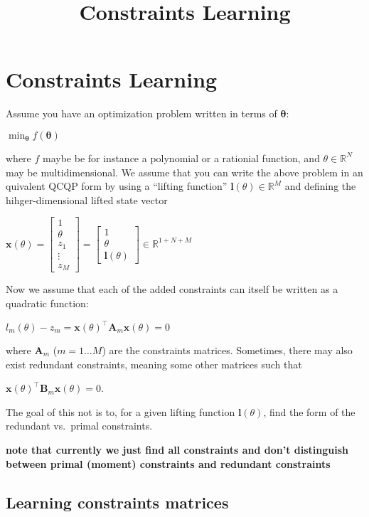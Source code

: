 \documentclass[11pt]{article}
\title{Constraints Learning}
\newcommand{\vc}[1]{\ensuremath{\bm{#1}}}
\begin{document}
  
\maketitle
  
\section{Constraints Learning}\label{constraints-learning}

Assume you have an optimization problem written in terms of
\(\vc{\theta}\):

\(\min_{\vc{\theta}} f(\vc{\theta})\)

where \(f\) maybe be for instance a polynomial or a rationial function,
and \(\theta \in \mathbb{R}^N\) may be multidimensional. We assume that
you can write the above problem in an quivalent QCQP form by using a
``lifting function'' \(\vc{l}(\theta) \in \mathbb{R}^M\) and
defining the hihger-dimensional lifted state vector

\(\vc{x}(\theta) = \begin{bmatrix}1 \\ \theta \\ z_1 \\ \vdots \\ z_M \end{bmatrix} = \begin{bmatrix}1 \\ \theta \\ \vc{l}(\theta) \end{bmatrix} \in \mathbb{R}^{1+N+M}\)

Now we assume that each of the added constraints can itself be written
as a quadratic function:

\(l_m(\theta) - z_m = \vc{x}(\theta)^\top \vc{A}_m \vc{x}(\theta) = 0\)

where \(\vc{A}_m\) (\(m=1\ldots M\)) are the constraints matrices.
Sometimes, there may also exist redundant constraints, meaning some
other matrices such that

\(\vc{x}(\theta)^\top \vc{B}_m \vc{x}(\theta) = 0\).

The goal of this not is to, for a given lifting function
\(\vc{l}(\theta)\), find the form of the redundant vs.~primal
constraints.

\textbf{note that currently we just find all constraints and don't
distinguish between primal (moment) constraints and redundant
constraints}

\subsection{Learning constraints matrices}
\end{document}
